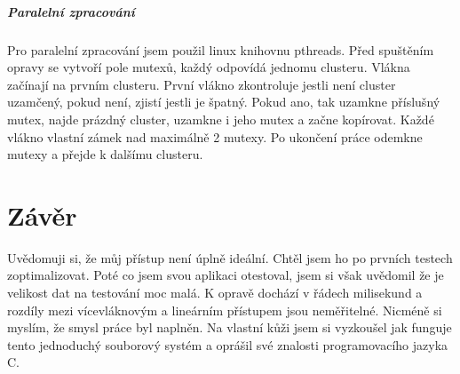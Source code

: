 \documentclass[12pt, a4paper]{article}
\begin{document}
\subparagraph{Paralelní zpracování}
Pro paralelní zpracování jsem použil linux knihovnu pthreads. Před spuštěním opravy se vytvoří pole mutexů, každý odpovídá jednomu clusteru. Vlákna začínají na prvním clusteru. První vlákno zkontroluje jestli není cluster uzamčený, pokud není, zjistí jestli je špatný. Pokud ano, tak uzamkne příslušný mutex, najde prázdný cluster, uzamkne i jeho mutex a začne kopírovat. Každé vlákno vlastní zámek nad maximálně 2 mutexy. Po ukončení práce odemkne mutexy a přejde k dalšímu clusteru.
\section{Závěr}
Uvědomuji si, že můj přístup není úplně ideální. Chtěl jsem ho po prvních testech zoptimalizovat. Poté co jsem svou aplikaci otestoval, jsem si však uvědomil že je velikost dat na testování moc malá. K opravě dochází v řádech milisekund a rozdíly mezi vícevláknovým a lineárním přístupem jsou neměřitelné. Nicméně si myslím, že smysl práce byl naplněn. Na vlastní kůži jsem si vyzkoušel jak funguje tento jednoduchý souborový systém a oprášil své znalosti programovacího jazyka C. 
\end{document}
